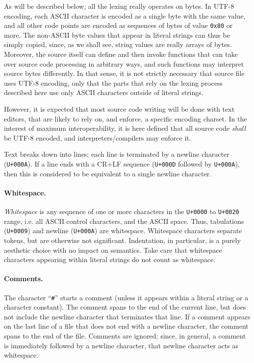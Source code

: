 \begin{rationale}

As will be described below, all the lexing really operates on bytes. In
UTF-8 encoding, each ASCII character is encoded as a single byte with
the same value, and all other code points are encoded as sequences of
bytes of value \verb|0x80| or more. The non-ASCII byte values that
appear in literal strings can thus be simply copied, since, as we shall
see, string values are really arrays of bytes. Moreover, the source
itself can define and then invoke functions that can take over source
code processing in arbitrary ways, and such functions may interpret
source bytes differently. In that sense, it is not strictly necessary
that source file uses UTF-8 encoding, only that the parts that rely on
the lexing process described here use only ASCII characters outside of
literal strings.

However, it is expected that most source code writing will be done with
text editors, that are likely to rely on, and enforce, a specific
encoding charset. In the interest of maximum interoperability, it is
here defined that all source code \emph{shall} be UTF-8 encoded, and
interpreters/compilers may enforce it.
\end{rationale}

Text breaks down into lines; each line is terminated by a newline
character (\verb|U+000A|). If a line ends with a CR+LF sequence
(\verb|U+000D| followed by \verb|U+000A|), then this is considered to be
equivalent to a single newline character.

\paragraph{Whitespace.} \emph{Whitespace} is any sequence of one or more
characters in the \verb|U+0000| to \verb|U+0020| range, i.e. all ASCII
control characters, and the ASCII space. Thus, tabulations
(\verb|U+0009|) and newline (\verb|U+000A|) are whitespace. Whitespace
characters separate tokens, but are otherwise not significant.
Indentation, in particular, is a purely aesthetic choice with no impact
on semantics. Take care that whitespace characters appearing within
literal strings do not count as whitespace.

\paragraph{Comments.} The character ``\verb|#|'' starts a comment
(unless it appears within a literal string or a character constant). The
comment spans to the end of the current line, but does not include the
newline character that terminates that line. If a comment appears on the
last line of a file that does not end with a newline character, the
comment spans to the end of the file. Comments are ignored; since, in
general, a comment is immediately followed by a newline character, that
newline character acts as whitespace.

